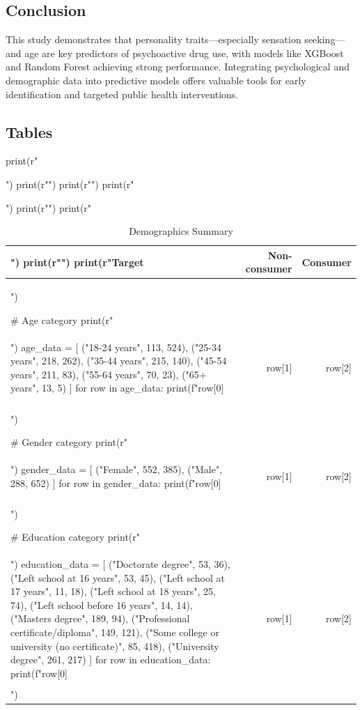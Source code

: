 \documentclass{article}
\begin{document}
\subsection*{Conclusion}

This study demonstrates that personality traits—especially sensation seeking—and age are key predictors of psychoactive drug use, with models like XGBoost and Random Forest achieving strong performance. Integrating psychological and demographic data into predictive models offers valuable tools for early identification and targeted public health interventions.

\subsection*{Tables}
\begin{pycode}
print(r"\begin{table}[h!]")
print(r"\centering")
print(r"\small")
print(r"\caption{Demographics Summary}")
print(r"\label{tab:summary-demographic}")
print(r"\begin{tabular}{|l|r|r|}")
print(r"\hline")
print(r"\textbf{Target} & \textbf{Non-consumer} & \textbf{Consumer} \\ \hline")

# Age category
print(r"\multicolumn{3}{|l|}{\textbf{Age category}} \\ \hline")
age_data = [
    ("18-24 years", 113, 524),
    ("25-34 years", 218, 262),
    ("35-44 years", 215, 140),
    ("45-54 years", 211, 83),
    ("55-64 years", 70, 23),
    ("65+ years", 13, 5)
    ]
for row in age_data:
    print(f"{row[0]} & {row[1]} & {row[2]} \\\\ \hline")

# Gender category
print(r"\multicolumn{3}{|l|}{\textbf{Gender category}} \\ \hline")
gender_data = [
    ("Female", 552, 385),
    ("Male", 288, 652)
    ]
for row in gender_data:
    print(f"{row[0]} & {row[1]} & {row[2]} \\\\ \hline")

# Education category
print(r"\multicolumn{3}{|l|}{\textbf{Education category}} \\ \hline")
education_data = [
    ("Doctorate degree", 53, 36),
    ("Left school at 16 years", 53, 45),
    ("Left school at 17 years", 11, 18),
    ("Left school at 18 years", 25, 74),
    ("Left school before 16 years", 14, 14),
    ("Masters degree", 189, 94),
    ("Professional certificate/diploma", 149, 121),
    ("Some college or university (no certificate)", 85, 418),
    ("University degree", 261, 217)
    ]
for row in education_data:
    print(f"{row[0]} & {row[1]} & {row[2]} \\\\ \hline")


\end{tabular}
\end{table}
\end{pycode}
\end{document}
